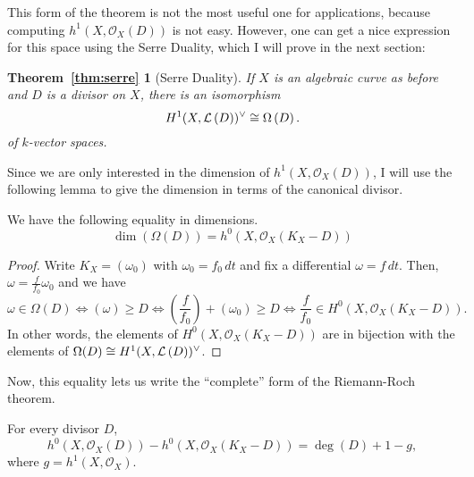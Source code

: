 This form of the theorem is not the most useful one for applications,
because computing $h^{1}(X,\mathscr{O}_X(D))$ is not easy. However, one can
get a nice expression for this space using the Serre Duality, which
I will prove in the next section:
\newtheorem*{thm:serre}{Theorem~\ref{thm:serre}}
\begin{thm:serre}[Serre Duality]
  If $X$ is an algebraic curve as before
  and $D$ is a divisor on $X$, there is an isomorphism
  \[
    H^1(X,\mathcal{L}\left(D\right))^{\vee}\cong \Omega\left(D\right).
  \]
  of $k$-vector spaces.
\end{thm:serre}
Since we are only interested in the dimension of $h^{1}(X,\mathscr{O}_X(D))$,
I will use the following lemma to give the dimension in terms of the
canonical divisor.
\begin{lemm}\label{lemm:diffs_dim}
  We have the following equality in dimensions.
  \[\dim\left(\Omega(D)\right)=h^{0}(X,\mathscr{O}_X(K_{X}-D))\]
\end{lemm}
\begin{proof}
  Write $K_{X}=(\omega_{0})$ with $\omega_{0}=f_{0}\,dt$ and fix a
  differential $\omega=f\,dt$. Then, $\omega=\frac{f}{f_{0}}\omega_{0}$
  and we have
  \[
    \omega\in\Omega(D)\iff (\omega)\geq D
    \iff\left(\frac{f}{f_{0}}\right)+(\omega_{0})\geq D\iff
    \frac{f}{f_{0}}\in H^{0}(X,\mathscr{O}_X(K_{X}-D)).
  \]
  In other words, the elements of $H^{0}(X,\mathscr{O}_X(K_{X}-D))$ are in
  bijection with the elements of $\Omega(D)\cong H^1(X,\mathcal{L}\left(D\right))^{\vee}$.
\end{proof}
Now, this equality lets us write the ``complete'' form of the Riemann-Roch
theorem.
\begin{thm}\label{thm:riemann_roch}
  For every divisor $D$,
  \[
    h^{0}(X, \mathscr{O}_X(D))-h^{0}(X, \mathscr{O}_X(K_{X}-D))=\deg(D)+1-g,
  \]
  where $g=h^{1}(X, \mathscr{O}_{X})$.
\end{thm}

